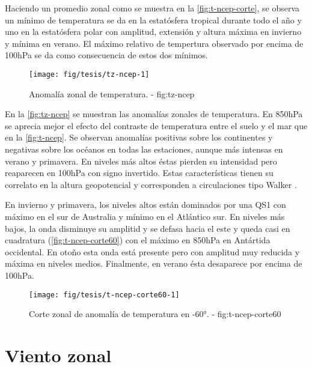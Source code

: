 \documentclass[spanish,a4paper]{book}
\begin{document}
Haciendo un promedio zonal como se muestra en la
\autoref{fig:t-ncep-corte}, se observa un mínimo de temperatura se da en
la estatósfera tropical durante todo el año y uno en la estatósfera
polar con amplitud, extensión y altura máxima en invierno y mínima en
verano. El máximo relativo de tempertura observado por encima de 100hPa
se da como consecuencia de estos dos mínimos.

\begin{landscape}\begin{figure}

{\centering \texttt{[image: fig/tesis/tz-ncep-1]} 

}

\caption{Anomalía zonal de temperatura. - fig:tz-ncep}\label{fig:tz-ncep}
\end{figure}
\end{landscape}

En la \autoref{fig:tz-ncep} se muestran las anomalías zonales de
temperatura. En 850hPa se aprecia mejor el efecto del contraste de
temperatura entre el suelo y el mar que en la \autoref{fig:t-ncep}. Se
observan anomalías positivas sobre los continentes y negativas sobre los
océanos en todas las estaciones, aunque más intensas en verano y
primavera. En niveles más altos éstas pierden su intensidad pero
reaparecen en 100hPa con signo invertido. Estas características tienen
su correlato en la altura geopotencial y corresponden a circulaciones
tipo Walker .

En invierno y primavera, los niveles altos están dominados por una QS1
con máximo en el sur de Australia y mínimo en el Atlántico sur. En
niveles más bajos, la onda disminuye su amplitid y se defasa hacia el
este y queda casi en cuadratura (\autoref{fig:t-ncep-corte60}) con el
máximo en 850hPa en Antártida occidental. En otoño esta onda está
presente pero con amplitud muy reducida y máxima en niveles medios.
Finalmente, en verano ésta desaparece por encima de 100hPa.

\begin{figure}

{\centering \texttt{[image: fig/tesis/t-ncep-corte60-1]} 

}

\caption{Corte zonal de anomalía de temperatura en -60°. - fig:t-ncep-corte60}\label{fig:t-ncep-corte60}
\end{figure}

\section{Viento zonal}\label{viento-zonal}
\end{document}
